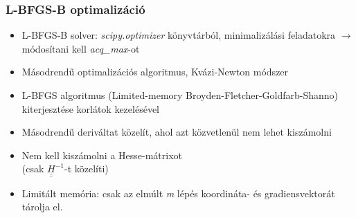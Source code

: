 \documentclass[aspectratio=43]{beamer}
\begin{document}
\begin{frame}
	\frametitle{L-BFGS-B optimalizáció}
	\begin{itemize}
		\item L-BFGS-B solver: \textit{scipy.optimizer} könyvtárból, minimalizálási feladatokra $\rightarrow$ módosítani kell \textit{acq\_max}-ot
		\item Másodrendű optimalizációs algoritmus, Kvázi-Newton módszer
		\item L-BFGS algoritmus (Limited-memory Broyden-Fletcher-Goldfarb-Shanno) kiterjesztése korlátok kezelésével
		\item Másodrendű deriváltat közelít, ahol azt közvetlenül nem lehet kiszámolni
		\item Nem kell kiszámolni a Hesse-mátrixot\\(csak $\underline{\underline{H}}^{-1}$-t közelíti)
		\item Limitált memória: csak az elmúlt \textit{m} lépés koordináta- és gradiensvektorát tárolja el.
	\end{itemize}
	
\end{frame}

\end{document}
